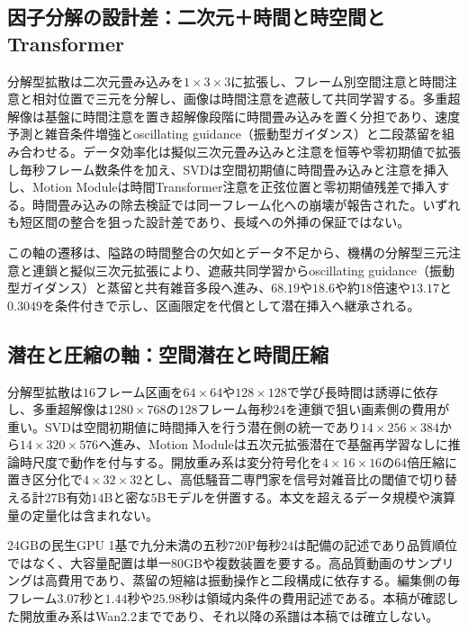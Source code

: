 \documentclass[lualatex,a4paper,10pt]{jlreq}
\begin{document}
\subsection{因子分解の設計差：二次元＋時間と時空間とTransformer}
分解型拡散は二次元畳み込みを$1 \times 3 \times 3$に拡張し、フレーム別空間注意と時間注意と相対位置で三元を分解し、画像は時間注意を遮蔽して共同学習する\autocite{btd070}。多重超解像は基盤に時間注意を置き超解像段階に時間畳み込みを置く分担であり、速度予測と雑音条件増強とoscillating guidance（振動型ガイダンス）と二段蒸留を組み合わせる\autocite{btd071}。データ効率化は擬似三次元畳み込みと注意を恒等や零初期値で拡張し毎秒フレーム数条件を加え、SVDは空間初期値に時間畳み込みと注意を挿入し、Motion Moduleは時間Transformer注意を正弦位置と零初期値残差で挿入する\autocite{btd073,btd075,btd074}。時間畳み込みの除去検証では同一フレーム化への崩壊が報告された\autocite{btd074}。いずれも短区間の整合を狙った設計差であり、長域への外挿の保証ではない\autocite{btd070,btd071,btd073,btd074,btd075}。

この軸の遷移は、隘路の時間整合の欠如とデータ不足から、機構の分解型三元注意と連鎖と擬似三次元拡張により、遮蔽共同学習からoscillating guidance（振動型ガイダンス）と蒸留と共有雑音多段へ進み、$68.19$や$18.6$や約$18$倍速や$13.17$と$0.3049$を条件付きで示し、区画限定を代償として潜在挿入へ継承される\autocite{btd070,btd071,btd073,btd075}。

\subsection{潜在と圧縮の軸：空間潜在と時間圧縮}
分解型拡散は$16$フレーム区画を$64 \times 64$や$128 \times 128$で学び長時間は誘導に依存し、多重超解像は$1280 \times 768$の$128$フレーム毎秒$24$を連鎖で狙い画素側の費用が重い\autocite{btd070,btd071}。SVDは空間初期値に時間挿入を行う潜在側の統一であり$14 \times 256 \times 384$から$14 \times 320 \times 576$へ進み、Motion Moduleは五次元拡張潜在で基盤再学習なしに推論時尺度で動作を付与する\autocite{btd075,btd074}。開放重み系は変分符号化を$4 \times 16 \times 16$の$64$倍圧縮に置き区分化で$4 \times 32 \times 32$とし、高低騒音二専門家を信号対雑音比の閾値で切り替える計$27$B有効$14$Bと密な$5$Bモデルを併置する\autocite{btd124}。本文を超えるデータ規模や演算量の定量化は含まれない\autocite{btd124}。

24GBの民生GPU 1基で九分未満の五秒$720$P毎秒$24$は配備の記述であり品質順位ではなく、大容量配置は単一$80$GBや複数装置を要する\autocite{btd124}。高品質動画のサンプリングは高費用であり、蒸留の短縮は振動操作と二段構成に依存する\autocite{btd073,btd075,btd071}。編集側の毎フレーム$3.07$秒と$1.44$秒や$25.98$秒は領域内条件の費用記述である\autocite{btd138}。本稿が確認した開放重み系はWan2.2までであり、それ以降の系譜は本稿では確立しない\autocite{btd124}。
\end{document}
